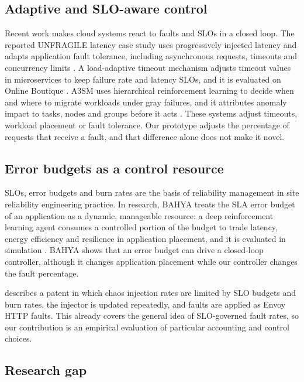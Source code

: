 \documentclass[a4paper,fleqn,11pt]{cas-dc}
\begin{document}
\subsection{Adaptive and SLO-aware control}\label{sec:lit:adaptive}

Recent work makes cloud systems react to faults and SLOs in a closed loop. The reported UNFRAGILE latency case study uses progressively injected latency and adapts application fault tolerance, including asynchronous requests, timeouts and concurrency limits \citep{botros2024towards}. A load-adaptive timeout mechanism adjusts timeout values in microservices to keep failure rate and latency SLOs, and it is evaluated on Online Boutique \citep{hanada2025slo}. A3SM uses hierarchical reinforcement learning to decide when and where to migrate workloads under gray failures, and it attributes anomaly impact to tasks, nodes and groups before it acts \citep{ye2026a3sm}. These systems adjust timeouts, workload placement or fault tolerance. Our prototype adjusts the percentage of requests that receive a fault, and that difference alone does not make it novel.

\subsection{Error budgets as a control resource}\label{sec:lit:slo}

SLOs, error budgets and burn rates are the basis of reliability management in site reliability engineering practice. In research, BAHYA treats the SLA error budget of an application as a dynamic, manageable resource: a deep reinforcement learning agent consumes a controlled portion of the budget to trade latency, energy efficiency and resilience in application placement, and it is evaluated in simulation \citep{souza2026bahya}. BAHYA shows that an error budget can drive a closed-loop controller, although it changes application placement while our controller changes the fault percentage.

\citet{bertsch2025chaos} describes a patent in which chaos injection rates are limited by SLO budgets and burn rates, the injector is updated repeatedly, and faults are applied as Envoy HTTP faults. This already covers the general idea of SLO-governed fault rates, so our contribution is an empirical evaluation of particular accounting and control choices.

\subsection{Research gap}\label{sec:lit:gap}
\end{document}
